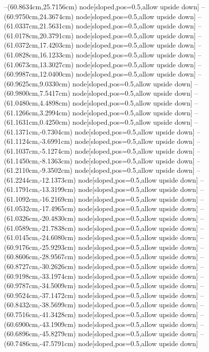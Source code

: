 --(60.8634cm,25.7156cm) node[sloped,pos=0.5,allow upside down]{\ArrowIn}
--(60.9750cm,24.3674cm) node[sloped,pos=0.5,allow upside down]{\ArrowIn}
--(61.0337cm,21.5631cm) node[sloped,pos=0.5,allow upside down]{\ArrowIn}
--(61.0178cm,20.3791cm) node[sloped,pos=0.5,allow upside down]{\ArrowIn}
--(61.0372cm,17.4203cm) node[sloped,pos=0.5,allow upside down]{\ArrowIn}
--(61.0828cm,16.1233cm) node[sloped,pos=0.5,allow upside down]{\ArrowIn}
--(61.0673cm,13.3027cm) node[sloped,pos=0.5,allow upside down]{\ArrowIn}
--(60.9987cm,12.0400cm) node[sloped,pos=0.5,allow upside down]{\ArrowIn}
--(60.9625cm,9.0330cm) node[sloped,pos=0.5,allow upside down]{\ArrowIn}
--(60.9800cm,7.5417cm) node[sloped,pos=0.5,allow upside down]{\ArrowIn}
--(61.0480cm,4.4898cm) node[sloped,pos=0.5,allow upside down]{\ArrowIn}
--(61.1266cm,3.2994cm) node[sloped,pos=0.5,allow upside down]{\ArrowIn}
--(61.1631cm,0.4250cm) node[sloped,pos=0.5,allow upside down]{\ArrowIn}
--(61.1371cm,-0.7304cm) node[sloped,pos=0.5,allow upside down]{\ArrowIn}
--(61.1124cm,-3.6991cm) node[sloped,pos=0.5,allow upside down]{\ArrowIn}
--(61.1037cm,-5.1274cm) node[sloped,pos=0.5,allow upside down]{\ArrowIn}
--(61.1450cm,-8.1363cm) node[sloped,pos=0.5,allow upside down]{\ArrowIn}
--(61.2110cm,-9.3502cm) node[sloped,pos=0.5,allow upside down]{\ArrowIn}
--(61.2244cm,-12.1373cm) node[sloped,pos=0.5,allow upside down]{\ArrowIn}
--(61.1791cm,-13.3199cm) node[sloped,pos=0.5,allow upside down]{\ArrowIn}
--(61.1092cm,-16.2169cm) node[sloped,pos=0.5,allow upside down]{\ArrowIn}
--(61.0532cm,-17.4965cm) node[sloped,pos=0.5,allow upside down]{\ArrowIn}
--(61.0326cm,-20.4830cm) node[sloped,pos=0.5,allow upside down]{\ArrowIn}
--(61.0589cm,-21.7838cm) node[sloped,pos=0.5,allow upside down]{\ArrowIn}
--(61.0145cm,-24.6080cm) node[sloped,pos=0.5,allow upside down]{\ArrowIn}
--(60.9176cm,-25.9293cm) node[sloped,pos=0.5,allow upside down]{\ArrowIn}
--(60.8606cm,-28.9567cm) node[sloped,pos=0.5,allow upside down]{\ArrowIn}
--(60.8727cm,-30.2626cm) node[sloped,pos=0.5,allow upside down]{\ArrowIn}
--(60.9198cm,-33.1974cm) node[sloped,pos=0.5,allow upside down]{\ArrowIn}
--(60.9787cm,-34.5009cm) node[sloped,pos=0.5,allow upside down]{\ArrowIn}
--(60.9524cm,-37.1472cm) node[sloped,pos=0.5,allow upside down]{\ArrowIn}
--(60.8432cm,-38.5699cm) node[sloped,pos=0.5,allow upside down]{\ArrowIn}
--(60.7516cm,-41.3428cm) node[sloped,pos=0.5,allow upside down]{\ArrowIn}
--(60.6900cm,-43.1909cm) node[sloped,pos=0.5,allow upside down]{\ArrowIn}
--(60.6896cm,-45.8279cm) node[sloped,pos=0.5,allow upside down]{\ArrowIn}
--(60.7486cm,-47.5791cm) node[sloped,pos=0.5,allow upside down]{\ArrowIn}
